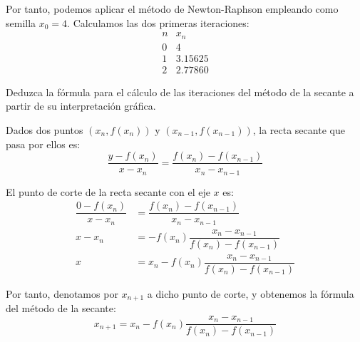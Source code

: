 \begin{ejercicio}
    Por tanto, podemos aplicar el método de Newton-Raphson empleando como semilla $x_0=4$. Calculamos las dos primeras iteraciones:
    \begin{equation*}
        \begin{array}{c|c}
            n & x_n\\
            \hline
            0 & 4\\
            1 & 3.15625\\
            2 & 2.77860
        \end{array}
    \end{equation*}
\end{ejercicio}


\begin{ejercicio}\label{ej:1.1.4}
    Deduzca la fórmula para el cálculo de las iteraciones del método de la secante a partir de su interpretación gráfica.

    Dados dos puntos $(x_n, f(x_n))$ y $(x_{n-1}, f(x_{n-1}))$, la recta secante que pasa por ellos es:
    \begin{equation*}
        \dfrac{y-f(x_{n})}{x-x_{n}}=\dfrac{f(x_n)-f(x_{n-1})}{x_n-x_{n-1}}
    \end{equation*}

    El punto de corte de la recta secante con el eje $x$ es:
    \begin{align*}
        \dfrac{0-f(x_{n})}{x-x_{n}}&=\dfrac{f(x_n)-f(x_{n-1})}{x_n-x_{n-1}}\\
        x-x_{n}&=-f(x_{n})\dfrac{x_n-x_{n-1}}{f(x_n)-f(x_{n-1})}\\
        x&=x_{n}-f(x_{n})\dfrac{x_n-x_{n-1}}{f(x_n)-f(x_{n-1})}
    \end{align*}

    Por tanto, denotamos por $x_{n+1}$ a dicho punto de corte, y obtenemos la fórmula del método de la secante:
    \begin{equation*}
        x_{n+1}=x_n-f(x_n)\dfrac{x_n-x_{n-1}}{f(x_n)-f(x_{n-1})}
    \end{equation*}
\end{ejercicio}


